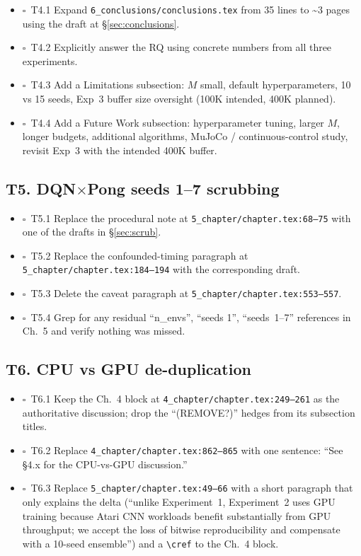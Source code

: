 \documentclass[11pt,a4paper]{article}
\newcommand{\todoitem}{$\square$~}
\newcommand{\fileline}[1]{\texttt{\small #1}}
\begin{document}
\begin{itemize}[leftmargin=*,itemsep=2pt]
  \item \todoitem T4.1 Expand \fileline{6\_conclusions/conclusions.tex}
  from 35 lines to \textasciitilde 3 pages using the draft at
  \S\ref{sec:conclusions}.
  \item \todoitem T4.2 Explicitly answer the RQ using concrete numbers
  from all three experiments.
  \item \todoitem T4.3 Add a Limitations subsection: $M$ small, default
  hyperparameters, 10 vs 15 seeds, Exp~3 buffer size oversight
  (100K intended, 400K planned).
  \item \todoitem T4.4 Add a Future Work subsection: hyperparameter
  tuning, larger $M$, longer budgets, additional algorithms, MuJoCo /
  continuous-control study, revisit Exp~3 with the intended 400K buffer.
\end{itemize}

\subsection*{T5. DQN$\times$Pong seeds 1--7 scrubbing}

\begin{itemize}[leftmargin=*,itemsep=2pt]
  \item \todoitem T5.1 Replace the procedural note at
  \fileline{5\_chapter/chapter.tex:68--75} with one of the drafts in
  \S\ref{sec:scrub}.
  \item \todoitem T5.2 Replace the confounded-timing paragraph at
  \fileline{5\_chapter/chapter.tex:184--194} with the corresponding
  draft.
  \item \todoitem T5.3 Delete the caveat paragraph at
  \fileline{5\_chapter/chapter.tex:553--557}.
  \item \todoitem T5.4 Grep for any residual ``n\_envs'', ``seeds 1'',
  ``seeds~1--7'' references in Ch.~5 and verify nothing was missed.
\end{itemize}

\subsection*{T6. CPU vs GPU de-duplication}

\begin{itemize}[leftmargin=*,itemsep=2pt]
  \item \todoitem T6.1 Keep the Ch.~4 block at
  \fileline{4\_chapter/chapter.tex:249--261} as the authoritative
  discussion; drop the ``(REMOVE?)'' hedges from its subsection
  titles.
  \item \todoitem T6.2 Replace \fileline{4\_chapter/chapter.tex:862--865}
  with one sentence: ``See \S4.x for the CPU-vs-GPU discussion.''
  \item \todoitem T6.3 Replace \fileline{5\_chapter/chapter.tex:49--66}
  with a short paragraph that only explains the delta
  (``unlike Experiment~1, Experiment~2 uses GPU training because Atari
  CNN workloads benefit substantially from GPU throughput; we accept
  the loss of bitwise reproducibility and compensate with a 10-seed
  ensemble'') and a \fileline{\textbackslash cref} to the Ch.~4 block.
\end{itemize}
\end{document}
